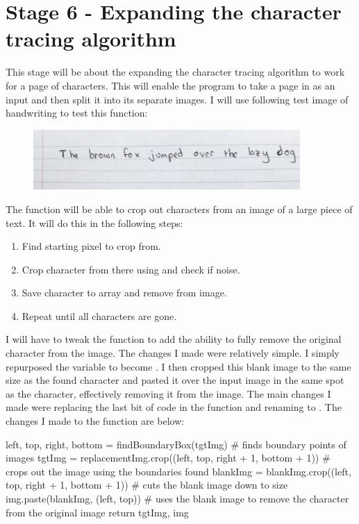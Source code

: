 \documentclass{report}
\begin{document}
\section{Stage 6 - Expanding the character tracing algorithm}
This stage will be about the expanding the character tracing algorithm to work for a page of characters. This will enable the program to take a page in as an input and then split it into its separate images. I will use following test image of handwriting to test this function:
\begin{figure}[H]
    \centering
    \includegraphics[width = 4in]{Images/Development and Testing/Stage 6/Test Images/testImage.jpg}
    \label{fig:Test Images}
\end{figure}
\noindent The function will be able to crop out characters from an image of a large piece of text. It will do this in the following steps:
\begin{enumerate}
    \item Find starting pixel to crop from.
    \item Crop character from there using  and check if noise.
    \item Save character to array and remove from image.
    \item Repeat until all characters are gone.
\end{enumerate}
I will have to tweak the  function to add the ability to fully remove the original character from the image. The changes I made were relatively simple. I simply repurposed the  variable to become . I then cropped this blank image to the same size as the found character and pasted it over the input image in the same spot as the character, effectively removing it from the image. The main changes I made were replacing the last bit of code in the function and renaming  to .
\newline 
The changes I made to the function are below:
\begin{python}
left, top, right, bottom = findBoundaryBox(tgtImg)  # finds boundary points of images
tgtImg = replacementImg.crop((left, top, right + 1, bottom + 1))  # crops out the image using the boundaries found
blankImg = blankImg.crop((left, top, right + 1, bottom + 1))  # cuts the blank image down to size
img.paste(blankImg, (left, top))  # uses the blank image to remove the character from the original image
return tgtImg, img
\end{python}
\end{document}
